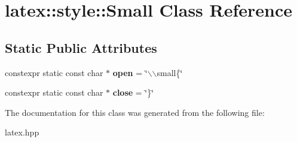 \hypertarget{classlatex_1_1style_1_1Small}{\section{latex\-:\-:style\-:\-:\-Small \-Class \-Reference}
\label{classlatex_1_1style_1_1Small}
}
\subsection*{\-Static \-Public \-Attributes}
\begin{DoxyCompactItemize}
\item 
\hypertarget{classlatex_1_1style_1_1Small_aa4b5eb60283c5aca66119e49f5e1899a}{constexpr static const char $\ast$ {\bfseries open} = \char`\"{}$\backslash$$\backslash$small\{\char`\"{}}\label{classlatex_1_1style_1_1Small_aa4b5eb60283c5aca66119e49f5e1899a}

\item 
\hypertarget{classlatex_1_1style_1_1Small_a3e5d6979e01474f784f1072eadd0caca}{constexpr static const char $\ast$ {\bfseries close} = \char`\"{}\}\char`\"{}}\label{classlatex_1_1style_1_1Small_a3e5d6979e01474f784f1072eadd0caca}

\end{DoxyCompactItemize}


\-The documentation for this class was generated from the following file\-:\begin{DoxyCompactItemize}
\item 
latex.\-hpp\end{DoxyCompactItemize}
